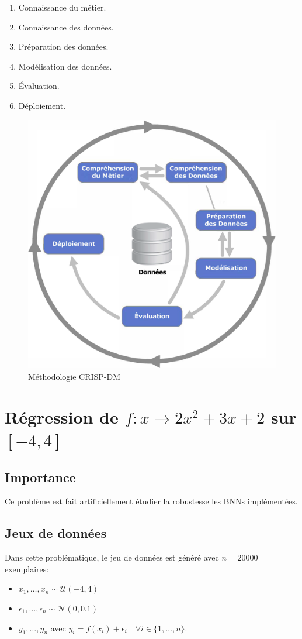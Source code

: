\begin{enumerate}
	\item Connaissance du métier.
	\item Connaissance des données.
	\item Préparation des données.
	\item Modélisation des données.
	\item Évaluation.
	\item Déploiement.
\end{enumerate}
\begin{figure}[h!]
	\centering
	\includegraphics[width=.5\textwidth]{Figures/CRISP-DM.png}
	\caption{Méthodologie CRISP-DM}
	\label{fig:CRSIP-DM}
\end{figure}
\FloatBarrier
\newpage
\section{Régression de $f:x\rightarrow 2x^2+3x+2$ sur $[-4,4]$}
\subsection{Importance}
Ce problème est fait artificiellement étudier la robustesse les  BNNs implémentées.
\subsection{Jeux de données}
Dans cette problématique, le jeu de données est généré avec $n=20000$ exemplaires:
\begin{itemize}
	\item $x_1,\dots,x_n \sim \mathcal{U}(-4,4)$ 
	\item $\epsilon_1,\dots,\epsilon_n \sim \mathcal{N}(0,0.1)$
	\item $y_1,\dots,y_n$ avec $y_i=f(x_i)+\epsilon_i\quad \forall i\in\{1,\dots,n\}.$ 
\end{itemize}

